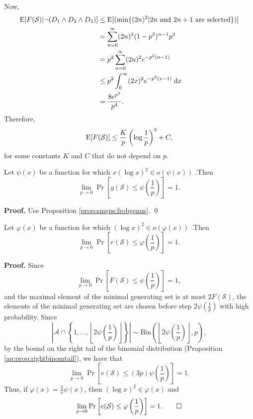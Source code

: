 Now,
\begin{align*}
    \EE[F(\mathcal{S}) |\lnot(D_1 \land D_2 \land D_3)] &\leq \EE[(\min\{(2n)^2|2n \text{ and } 2n + 1 \text{ are selected} \})]
    \\&= \sum_{n = 0}^\infty (2n)^2 (1 - p^2)^{n - 1}p^2
    \\&= p^2\sum_{n = 0}^\infty (2n)^2 e^{-p^2(n - 1)}
    \\&\leq p^2 \int_{0}^\infty (2x)^2 e^{-p^2(x - 1)}\;\mathrm{d}x
    \\&= \frac{8e^{p^2}}{p^4}.
\end{align*}
Therefore, 
\[\EE[F(\mathcal{S})] \leq \frac{K}{p}\left(\log \frac{1}{p}\right)^3 + C,\]
for some constants $K$ and $C$ that do not depend on $p$.
\begin{corollary}
    Let $\psi(x)$ be a function for which $x(\log x)^2 \in o(\psi(x))$ .Then
    \[\lim_{p \to 0}\Pr\left[g(\mathcal{S}) \leq \psi\left(\frac{1}{p}\right)\right] = 1.\]
\end{corollary}
\textbf{Proof. } Use Proposition \ref{prop:smgps:frobgenus}. \qed
\begin{corollary}
    Let $\varphi(x)$ be a function for which $(\log x)^2 \in o(\varphi(x))$ .Then
    \[\lim_{p \to 0}\Pr\left[e(\mathcal{S}) \leq \varphi\left(\frac{1}{p}\right)\right] = 1.\]
\end{corollary}
\textbf{Proof. } Since
\[\lim_{p \to 0}\Pr\left[F(\mathcal{S}) \leq \psi\left(\frac{1}{p}\right)\right] = 1,\]
and the maximal element of the minimal generating set is at most $2F(\mathcal{S})$, the elements of the minimal generating set are chosen before step $2\psi\left(\frac{1}{p}\right)$ with high probability. Since \[\left|\mathcal{A}\cap\left\{1, \ldots, \left\lfloor2\psi\left(\frac{1}{p}\right)\right \rfloor\right\}\right| \sim \mathrm{Bin}\left(\left\lfloor2\psi\left(\frac{1}{p}\right)\right \rfloor, p\right),\] by the bound on the right tail of the binomial distribution (Proposition \ref{ap:prop:rightbinomtail}), we have that
\[\lim_{p \to 0}\Pr\left[e(\mathcal{S}) \leq (3p)\psi\left(\frac{1}{p}\right)\right] = 1.\]
Thus, if $\varphi(x) = \frac{3}{x} \psi\left(x\right)$, then $(\log x)^2 \in \varphi(x)$ and 
\[\lim_{p \to 0}\Pr\left[e(\mathcal{S}) \leq \varphi\left(\frac{1}{p}\right)\right] = 1.\qed \]
